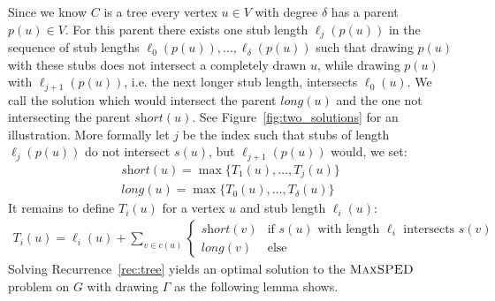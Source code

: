 \documentclass[a4paper,english,numberwithinsect]{eurocg18}
\newcommand{\maxsped}{\ensuremath{\textsc{MaxSPED}}\xspace}
\newcommand{\sollong}{\ensuremath{\textit{long}}\xspace}
\newcommand{\solshort}{\ensuremath{\textit{short}}\xspace}
\begin{document}
Since we know $ C $ is a tree every vertex $ u \in V $ with degree $ \delta $ has a parent $ p(u) \in V $. For this parent there exists one stub length $ \ell_j(p(u)) $ in the sequence of stub lengths $ \ell_0(p(u)),\dots,\ell_{\delta}(p(u)) $ such that drawing $ p(u) $ with these stubs does not intersect a completely drawn $ u $, while drawing $ p(u) $ with $ \ell_{j + 1}(p(u)) $, i.e. the next longer stub length, intersects $ \ell_0(u) $. We call the solution which would intersect the parent $ \sollong(u) $ and the one not intersecting the parent $ \solshort(u) $. See Figure~\ref{fig:two_solutions} for an illustration. More formally let $ j $ be the index such that stubs of length $ \ell_j(p(u)) $ do not intersect $ s(u) $, but $ \ell_{j +1}(p(u)) $ would, we set:
\begin{align*}
	\solshort(u) = \max\{T_1(u),\dots,T_j(u)\} \\
	\sollong(u) = \max\{T_0(u),\dots,T_{\delta}(u)\}
\end{align*}
It remains to define $ T_i(u) $ for a vertex $ u $ and stub length $ \ell_i(u) $:
\begin{align}
	\label{rec:tree}
	T_i(u) = \ell_i(u) + \sum_{v \in c(u)}
	\begin{cases}
		\solshort(v) & \text{if } s(u) \text{ with length } \ell_i \text{ intersects } s(v) \\
		\sollong(v) & \text{else}
	\end{cases}
\end{align}
Solving Recurrence~\ref{rec:tree} yields an optimal solution to the \maxsped problem on $ G $ with drawing $ \Gamma $ as the following lemma shows.
\end{document}
